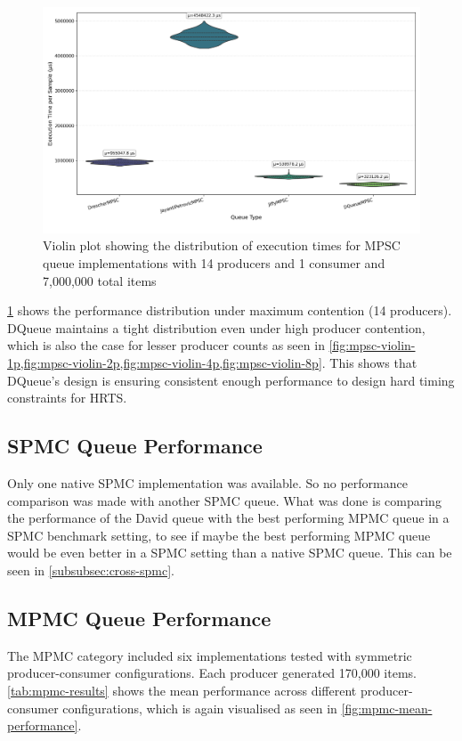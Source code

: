 \begin{figure}[htb]
\centering
\caption{Violin plot showing the distribution of execution times for MPSC queue implementations with 14 producers and 1 consumer and 7,000,000 total items}
\label{fig:mpsc-violin-14p}
\includegraphics[width=\textwidth]{images/results/mpsc_performance_violin_14_producers.png}
\end{figure}

\cref{fig:mpsc-violin-14p} shows the performance distribution under maximum contention (14 producers). DQueue maintains a tight distribution even under high producer contention, which is also the case for lesser producer counts as seen in \cref{fig:mpsc-violin-1p,fig:mpsc-violin-2p,fig:mpsc-violin-4p,fig:mpsc-violin-8p}. This shows that DQueue's design is ensuring consistent enough performance to design hard timing constraints for \ac{HRTS}.

\subsection{\acf{SPMC} Queue Performance}
Only one native \ac{SPMC} implementation was available. So no performance comparison was made with another \ac{SPMC} queue. What was done is comparing the performance of the David queue with the best performing \ac{MPMC} queue in a \ac{SPMC} benchmark setting, to see if maybe the best performing \ac{MPMC} queue would be even better in a \ac{SPMC} setting than a native \ac{SPMC} queue. This can be seen in \cref{subsubsec:cross-spmc}.

\subsection{\acf{MPMC} Queue Performance}
The \ac{MPMC} category included six implementations tested with symmetric producer-consumer configurations. Each producer generated 170,000 items. \cref{tab:mpmc-results} shows the mean performance across different producer-consumer configurations, which is again visualised as seen in \cref{fig:mpmc-mean-performance}.


